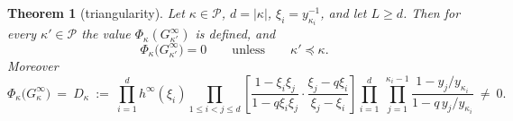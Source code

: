 \documentclass[11pt]{article}
\newtheorem{thm}{Theorem}
\theoremstyle{definition}
\theoremstyle{remark}
\newcommand{\PP}{\mathcal{P}}
\newcommand{\Gi}[1]{G^{\infty}_{#1}}
\begin{document}
\begin{thm}[triangularity]\label{thm:tri}
Let $\kappa\in\PP$, $d=|\kappa|$, $\xi_i=y_{\kappa_i}^{-1}$, and let $L\ge d$. Then for every
$\kappa'\in\PP$ the value $\Phi_\kappa(\Gi{\kappa'})$ is defined, and
\[
  \Phi_\kappa\bigl(\Gi{\kappa'}\bigr)=0
  \qquad\text{unless}\qquad \kappa'\preceq\kappa .
\]
Moreover
\begin{equation}\label{eq:diag}
  \Phi_\kappa\bigl(\Gi{\kappa}\bigr)\ =\ D_\kappa\ :=\
  \prod_{i=1}^{d}h^\infty(\xi_i)
  \prod_{1\le i<j\le d}\left[\frac{1-\xi_i\xi_j}{1-q\xi_i\xi_j}\cdot
                              \frac{\xi_j-q\xi_i}{\xi_j-\xi_i}\right]
  \prod_{i=1}^{d}\ \prod_{j=1}^{\kappa_i-1}\frac{1-y_j/y_{\kappa_i}}{1-q\,y_j/y_{\kappa_i}}
  \ \ne\ 0 .
\end{equation}
\end{thm}
\end{document}
